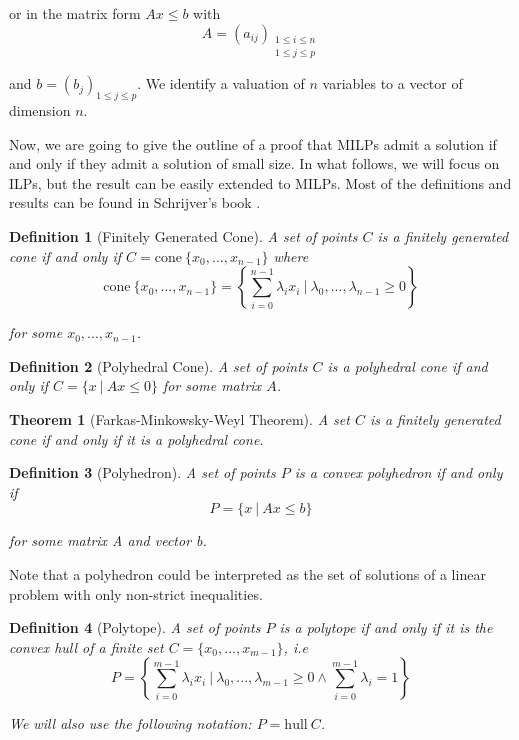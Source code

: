\documentclass{article}
\newcommand{\cone}{\mathrm{cone}}
\newcommand{\hull}{\mathrm{hull}}
\newcommand{\ifff}{if and only if}
\newtheorem{definition}{Definition}
\newtheorem{theorem}{Theorem}
\begin{document}
or in the matrix form $Ax \leqslant b$ with
$$A = (a_{ij})_{\substack{1 \leqslant i \leqslant n \\
                          1 \leqslant j \leqslant p}}$$
                          
and
$b = (b_j)_{1 \leqslant j \leqslant p}$. We identify a valuation of $n$
variables to a vector of dimension $n$.

Now, we are going to give the outline of a proof that MILPs admit a solution
if and only if they admit a solution of small size. In what follows, we will
focus on ILPs, but the result can be easily extended to MILPs. Most of the
definitions and results can be found in Schrijver's book
\cite[Sections 7 and 16]{Schrijver1998}.

\begin{definition}[Finitely Generated Cone]
  A set of points $C$ is a \textup{finitely generated cone}
  \ifff{} $C = \cone~\{x_0, ..., x_{n-1}\}$ where
  $$\cone~\{x_0, ..., x_{n-1}\} =
      \left\{\sum_{i=0}^{n-1} \lambda_i x_i~|~
               \lambda_0, ..., \lambda_{n-1} \geqslant 0\right\}
  $$

  for some $x_0, ..., x_{n-1}$.
\end{definition}

\begin{definition}[Polyhedral Cone]
  A set of points $C$ is a \textup{polyhedral cone}
  \ifff{} $C = \{x~|~Ax \leqslant 0\}$ for some matrix $A$.
\end{definition}

\begin{theorem}[Farkas-Minkowsky-Weyl Theorem]
  A set $C$ is a finitely generated cone \ifff{} it is a polyhedral cone.
\end{theorem}

\begin{definition}[Polyhedron]
  A set of points $P$ is a \textup{convex polyhedron} \ifff{}
  $$P = \{x~|~Ax \leqslant b\}$$

  for some matrix A and vector b.
\end{definition}

Note that a polyhedron could be interpreted as the set of solutions of a linear
problem with only non-strict inequalities.

\begin{definition}[Polytope]
  A set of points $P$ is a \textup{polytope} \ifff{} it is the convex hull of a
  finite set $C = \{x_0, ..., x_{m-1}\}$, \textit{i.e}
  $$P = \left\{
    \sum_{i=0}^{m-1} \lambda_i x_i~|~\lambda_0, ..., \lambda_{m-1} \geqslant 0
                                  \wedge \sum_{i=0}^{m-1} \lambda_i = 1
        \right\}$$

  We will also use the following notation: $P = \hull~C$.
\end{definition}
\end{document}
